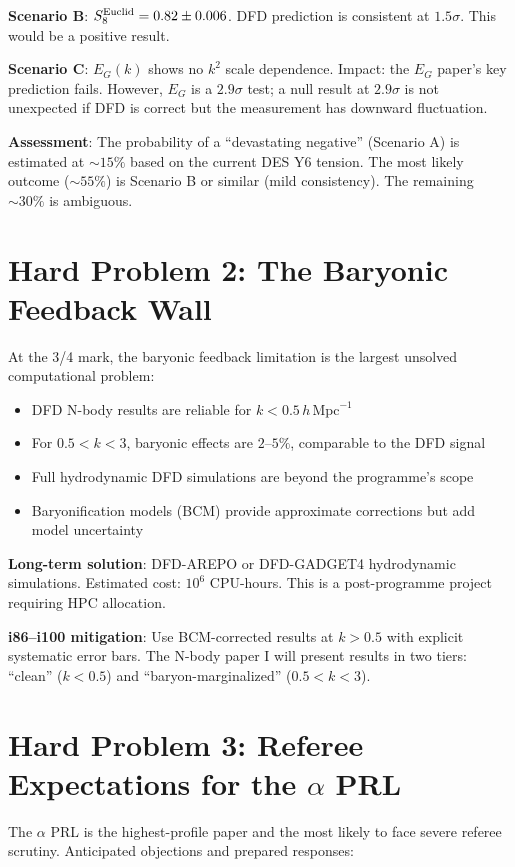 \documentclass[11pt,a4paper]{article}
\begin{document}
\textbf{Scenario B}: $S_8^{\rm Euclid} = 0.82 \pm 0.006$. DFD prediction is consistent at $1.5\sigma$. This would be a positive result.

\textbf{Scenario C}: $E_G(k)$ shows no $k^2$ scale dependence. Impact: the $E_G$ paper's key prediction fails. However, $E_G$ is a $2.9\sigma$ test; a null result at $2.9\sigma$ is not unexpected if DFD is correct but the measurement has downward fluctuation.

\textbf{Assessment}: The probability of a ``devastating negative'' (Scenario A) is estimated at $\sim 15\%$ based on the current DES Y6 tension. The most likely outcome ($\sim 55\%$) is Scenario B or similar (mild consistency). The remaining $\sim 30\%$ is ambiguous.

\section{Hard Problem 2: The Baryonic Feedback Wall}

At the 3/4 mark, the baryonic feedback limitation is the largest unsolved computational problem:

\begin{itemize}[nosep]
\item DFD N-body results are reliable for $k < 0.5\,h\,\text{Mpc}^{-1}$
\item For $0.5 < k < 3$, baryonic effects are $2$--$5\%$, comparable to the DFD signal
\item Full hydrodynamic DFD simulations are beyond the programme's scope
\item Baryonification models (BCM) provide approximate corrections but add model uncertainty
\end{itemize}

\textbf{Long-term solution}: DFD-AREPO or DFD-GADGET4 hydrodynamic simulations. Estimated cost: $10^6$ CPU-hours. This is a post-programme project requiring HPC allocation.

\textbf{i86--i100 mitigation}: Use BCM-corrected results at $k > 0.5$ with explicit systematic error bars. The N-body paper I will present results in two tiers: ``clean'' ($k < 0.5$) and ``baryon-marginalized'' ($0.5 < k < 3$).

\section{Hard Problem 3: Referee Expectations for the $\alpha$ PRL}

The $\alpha$ PRL is the highest-profile paper and the most likely to face severe referee scrutiny. Anticipated objections and prepared responses:
\end{document}

